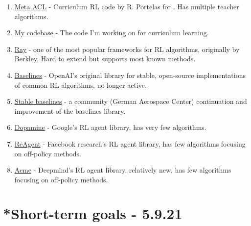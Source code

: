 \documentclass[letterpaper]{article}
\theoremstyle{definition}
\begin{document}
\begin{enumerate}
	
	\item 
	\href{https://github.com/flowersteam/meta-acl}{Meta ACL} - Curriculum RL code by R. Portelas for \cite{Portelas2020a}. Has multiple teacher algorithms.
	
	\item 
	\href{https://github.com/lioritan/phd-work}{My codebase} - The code I'm working on for curriculum learning.
	
	\item 
	\href{https://github.com/ray-project/ray}{Ray} - one of the most popular frameworks for RL algorithms, originally by Berkley. Hard to extend but supports most known methods.
	
	\item \href{https://github.com/openai/baselines}{Baselines} - OpenAI's original library for stable, open-source implementations of common RL algorithms, no longer active.
	
	\item 
	\href{https://github.com/DLR-RM/stable-baselines3}{Stable baselines} - a community (German Aerospace Center) continuation and improvement of the baselines library.
	
	\item 
	\href{https://github.com/google/dopamine}{Dopamine} - Google's RL agent library, has very few algorithms.
	
	\item 
	\href{https://github.com/facebookresearch/ReAgent}{ReAgent} - Facebook research's RL agent library, has few algorithms focusing on off-policy methods.
	
	\item 
	\href{https://github.com/deepmind/acme}{Acme} - Deepmind's RL agent library, relatively new, has few algorithms focusing on off-policy methods. 
	
\end{enumerate}

\section{*Short-term goals - 5.9.21} \label{sec:short-term}
\end{document}
